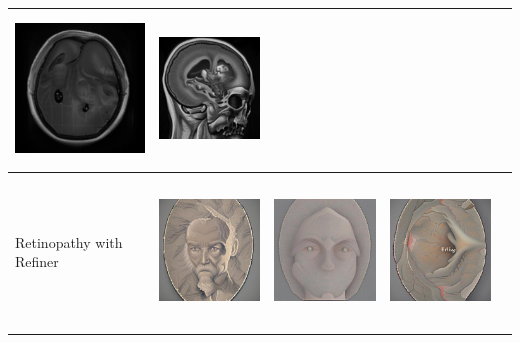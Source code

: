 \begin{table}[H]
\begin{tabularx}{\linewidth}{@{}>{\centering\arraybackslash}m{3cm}>{\centering\arraybackslash}X>{\centering\arraybackslash}X>{\centering\arraybackslash}X>{\centering\arraybackslash}X@{}}
\includegraphics[valign=M,width=\linewidth,height=4cm,keepaspectratio]{main/content/images/sd_dreambooth/dreambooth_xl_v1/refiner/glioma_1_ref.jpeg} & 
\includegraphics[valign=M,width=\linewidth,height=4cm,keepaspectratio]{main/content/images/sd_dreambooth/dreambooth_xl_v1/refiner/glioma_2_ref.jpeg} \\
\midrule
Retinopathy with Refiner &
\includegraphics[valign=M,width=\linewidth,height=4cm,keepaspectratio]{main/content/images/sd_dreambooth/dreambooth_xl_v1/refiner/ret_0_ref.jpeg} & 
\includegraphics[valign=M,width=\linewidth,height=4cm,keepaspectratio]{main/content/images/sd_dreambooth/dreambooth_xl_v1/refiner/ret_1_ref.jpeg} & 
\includegraphics[valign=M,width=\linewidth,height=4cm,keepaspectratio]{main/content/images/sd_dreambooth/dreambooth_xl_v1/refiner/ret_3_ref.jpeg} \\

\end{tabularx}
\end{table}
